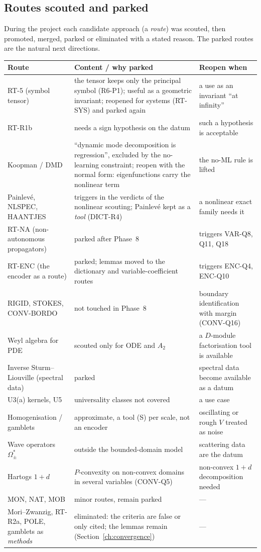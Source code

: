 \documentclass[11pt]{article}
\theoremstyle{plain}
\theoremstyle{definition}
\theoremstyle{remark}
\begin{document}
\subsection{Routes scouted and parked}

During the project each candidate approach (a \emph{route}) was scouted, then promoted, merged, parked or eliminated with a stated reason. The parked routes are the natural next directions.

\begin{center}\small
\begin{longtable}{@{}L{3.3cm}L{7.0cm}L{4.3cm}@{}}
\toprule
Route & Content / why parked & Reopen when\\\midrule\endhead
RT-5 (symbol tensor) & the tensor keeps only the principal symbol (R6-P1); useful as a geometric invariant; reopened for systems (RT-SYS) and parked again & a use as an invariant ``at infinity''\\
RT-R1b & needs a sign hypothesis on the datum & such a hypothesis is acceptable\\
Koopman / DMD & ``dynamic mode decomposition is regression'', excluded by the no-learning constraint; reopen with the normal form: eigenfunctions carry the nonlinear term & the no-ML rule is lifted\\
Painlev\'e, NLSPEC, HAANTJES & triggers in the verdicts of the nonlinear scouting; Painlev\'e kept as a \emph{tool} (DICT-R4) & a nonlinear exact family needs it\\
RT-NA (non-autonomous propagators) & parked after Phase~8 & triggers VAR-Q8, Q11, Q18\\
RT-ENC (the encoder as a route) & parked; lemmas moved to the dictionary and variable-coefficient routes & triggers ENC-Q4, ENC-Q10\\
RIGID, STOKES, CONV-BORDO & not touched in Phase~8 & boundary identification with margin (CONV-Q16)\\
Weyl algebra for PDE & scouted only for ODE and $A_2$ & a $D$-module factorisation tool is available\\
Inverse Sturm--Liouville (spectral data) & parked & spectral data become available as a datum\\
U3(a) kernels, U5 & universality classes not covered & a use case\\
Homogenisation / gamblets & approximate, a tool (S) per scale, not an encoder & oscillating or rough $V$ treated as noise\\
Wave operators $\Omega_\pm^*$ & outside the bounded-domain model & scattering data are the datum\\
Hartogs $1+d$ & $P$-convexity on non-convex domains in several variables (CONV-Q5) & non-convex $1+d$ decomposition needed\\
MON, NAT, MOB & minor routes, remain parked & ---\\
Mori--Zwanzig, RT-R2a, POLE, gamblets as \emph{methods} & eliminated: the criteria are false or only cited; the lemmas remain (Section~\ref{ch:convergence}) & ---\\
\bottomrule
\end{longtable}
\end{center}
\end{document}
